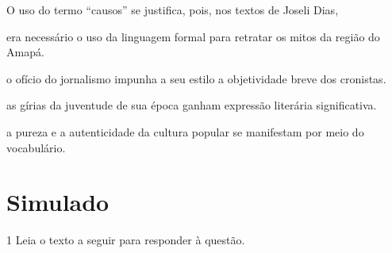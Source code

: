 O uso do termo ``causos'' se justifica, pois, nos textos de Joseli Dias,

\begin{escolha}
    
    \item era necessário o uso da linguagem formal para retratar os mitos da região do Amapá.
    
    \item o ofício do jornalismo impunha a seu estilo a objetividade breve dos cronistas.
    
    \item as gírias da juventude de sua época ganham expressão literária significativa.
    
    \item a pureza e a autenticidade da cultura popular se manifestam por meio do vocabulário.

\end{escolha}


\chapter[Simulado 4]{Simulado}

\num{1} Leia o texto a seguir para responder à questão. 

